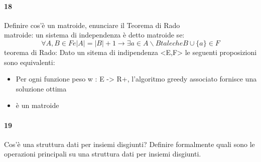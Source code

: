 \documentclass[12pt, a4paper, openany]{book}
\begin{document}
\paragraph{18}
Definire cos’è un matroide, enunciare il Teorema di Rado\\
matroide: un sistema di independenza è detto matroide se:
\begin{equation*}
	\forall A, B \in F e |A| = |B| + 1 \rightarrow \exists a \in A\backslash B tale che B \cup \{a\} \in F
\end{equation*}
teorema di Rado: Dato un sitema di indipendenza <E,F> le seguenti proposizioni sono equivalenti:
\begin{itemize}
	\item Per ogni funzione peso w : E -> R+, l'algoritmo greedy associato fornisce una soluzione ottima
	\item <E,F> è un matroide
\end{itemize}
\paragraph{19}
Cos’è una struttura dati per insiemi disgiunti? Definire formalmente quali
sono le operazioni principali su una struttura dati per insiemi disgiunti.
\tableofcontents
\end{document}

